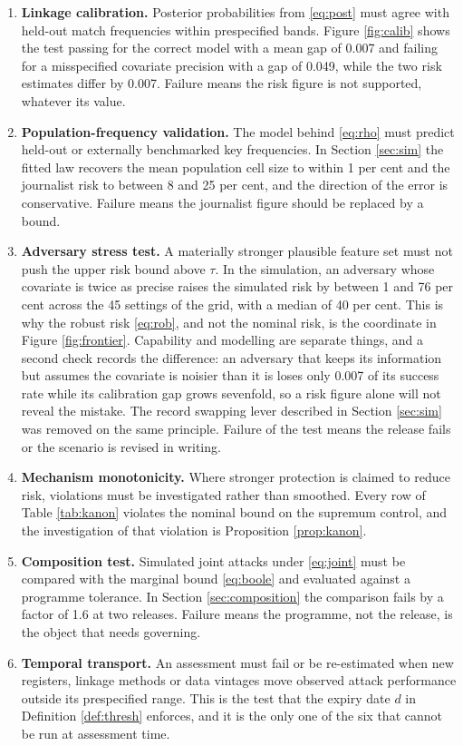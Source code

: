 \documentclass[11pt,a4paper]{article}
\theoremstyle{plain}
\theoremstyle{definition}
\begin{document}
\begin{enumerate}
\item \textbf{Linkage calibration.} Posterior probabilities from \eqref{eq:post}
must agree with held-out match frequencies within prespecified bands. Figure
\ref{fig:calib} shows the test passing for the correct model with a mean gap of
0.007 and failing for a misspecified covariate precision with a gap of 0.049,
while the two risk estimates differ by 0.007. Failure means the risk figure is not
supported, whatever its value.

\item \textbf{Population-frequency validation.} The model behind
\eqref{eq:rho} must predict held-out or externally benchmarked key frequencies.
In Section \ref{sec:sim} the fitted law recovers the mean population cell size
to within 1 per cent and the journalist risk to between 8 and 25 per cent, and
the direction of the error is conservative. Failure means the journalist figure
should be replaced by a bound.

\item \textbf{Adversary stress test.} A materially stronger plausible feature
set must not push the upper risk bound above $\tau$. In the simulation, an adversary whose
covariate is twice as precise raises the simulated risk by between 1 and 76 per
cent across the 45 settings of the grid, with a median of 40 per cent. This is
why the robust risk \eqref{eq:rob}, and not the nominal risk, is the coordinate
in Figure \ref{fig:frontier}. Capability and modelling are separate things, and
a second check records the difference: an adversary that keeps its information
but assumes the covariate is noisier than it is loses only 0.007 of its success
rate while its calibration gap grows sevenfold, so a risk figure alone will not
reveal the mistake. The record swapping lever described in Section
\ref{sec:sim} was removed on the same principle. Failure of the test means the
release fails or the scenario is revised in writing.

\item \textbf{Mechanism monotonicity.} Where stronger protection is claimed to
reduce risk, violations must be investigated rather than smoothed. Every row of
Table \ref{tab:kanon} violates the nominal bound on the supremum control, and
the investigation of that violation is Proposition \ref{prop:kanon}.

\item \textbf{Composition test.} Simulated joint attacks under \eqref{eq:joint}
must be compared with the marginal bound \eqref{eq:boole} and evaluated against
a programme tolerance. In Section \ref{sec:composition} the comparison fails by
a factor of 1.6 at two releases. Failure means the programme, not the release,
is the object that needs governing.

\item \textbf{Temporal transport.} An assessment must fail or be re-estimated
when new registers, linkage methods or data vintages move observed attack
performance outside its prespecified range. This is the test that the expiry
date $d$ in Definition \ref{def:thresh} enforces, and it is the only one of the
six that cannot be run at assessment time.
\end{enumerate}
\end{document}
